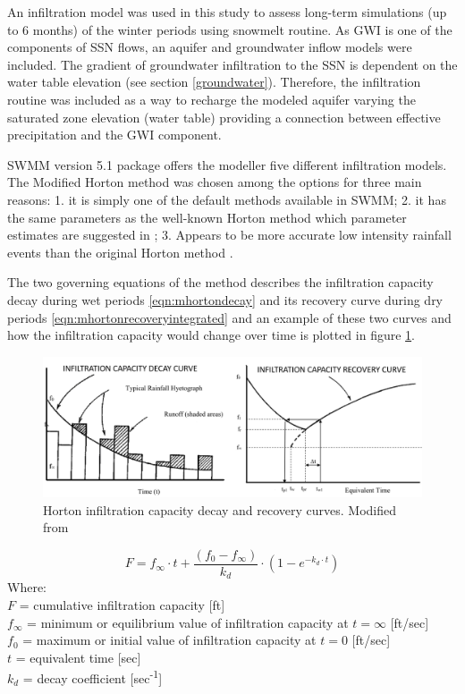 An infiltration model was used in this study to assess long-term simulations (up to 6 months) of the winter periods using snowmelt routine. As \acf{GWI} is one of the components of \acf{SSN} flows, an aquifer and groundwater inflow models were included. The gradient of groundwater infiltration to the \ac{SSN} is dependent on the water table elevation (see section \ref{groundwater}). Therefore, the infiltration routine was included as a way to recharge the modeled aquifer varying the saturated zone elevation (water table) providing a connection between effective precipitation and the \ac{GWI} component.

SWMM version 5.1 package offers the modeller five different infiltration models. The Modified Horton method \cite{akan1992,akan2003} was chosen among the options for three main reasons: 1. it is simply one of the default methods available in SWMM;  2. it has the same parameters as the well-known Horton method which parameter estimates are suggested in \citet{Rossman2016}; 3. Appears to be more accurate low intensity rainfall events than the original Horton method \cite{Rossman2016}. 

The two governing equations of the method describes the infiltration capacity decay during wet periods \ref{eqn:mhortondecay} and its recovery curve during dry periods \ref{eqn:mhortonrecoveryintegrated} and an example of these two curves and how the infiltration capacity would change over time is plotted in figure \ref{fig:horton}. 

\begin{figure}[h]
    \centering
	\includegraphics[scale=0.45]{figures/hortoncurves.png}
	\caption{Horton infiltration capacity decay and recovery curves. Modified from \cite{Rossman2016}}
	\label{fig:horton}
\end{figure}

\begin{equation}
\label{eqn:mhortondecay}
F = f_\infty \cdot t + \frac{(f_0 - f_\infty)}{k_d} \cdot (1 - e^{-k_d\cdot t})
\end{equation}
Where: \\
\indent $F$ = cumulative infiltration capacity [ft] \\
\indent $f_\infty$ = minimum or equilibrium value of infiltration capacity at $t = \infty$  [ft/sec] \\
\indent $f_0$ = maximum or initial value of infiltration capacity at $t = 0$ [ft/sec] \\
\indent $t$ = equivalent time [sec] \\
\indent $k_d$ = decay coefficient [sec\textsuperscript{-1}] \\

